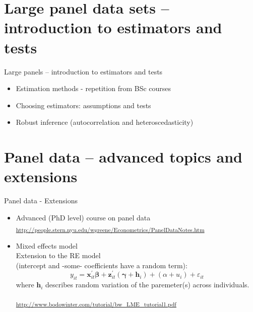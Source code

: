 \documentclass[usenames,dvipsnames]{beamer}
\begin{document}
\section{Large panel data sets -- introduction to estimators and tests}
\begin{frame}{Large panels -- introduction to estimators and tests}
    \begin{itemize}
        \item Estimation methods - repetition from BSc courses
        \bigskip
        \item Choosing estimators: assumptions and tests
        \bigskip
        \item Robust inference (autocorrelation and heteroscedasticity)
    \end{itemize}
\end{frame}










\section{Panel data -- advanced topics and extensions}
\begin{frame}{Panel data - Extensions}
\begin{itemize}
\item Advanced (PhD level) course on panel data \\
\textsubscript{\textcolor{Blue}{\url{http://people.stern.nyu.edu/wgreene/Econometrics/PanelDataNotes.htm}} }
\bigskip
\item Mixed effects model \\
Extension to the RE model \\(intercept and -some- coefficients have a random term):
$$
y_{it}=\bm{x}_{it}^{\prime} \bm{\beta} + \bm{z}_{it}^{\prime}( \bm{\gamma} + \bm{h}_i) +
(\alpha + u_i) + \varepsilon_{it}
$$
where $\bm{h}_i$ describes random variation of the paremeter(s) across individuals.\\
\medskip

\textsubscript{ \textcolor{Blue}{\url{http://www.bodowinter.com/tutorial/bw_LME_tutorial1.pdf}} } \\
\end{itemize}
\end{frame}
\end{document}
